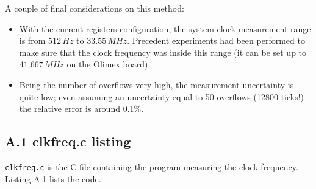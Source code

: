 A couple of final considerations on this method:

\begin{itemize}
	\item With the current registers configuration, the system clock measurement range is from $512\,Hz$ to $33.55\,MHz$. Precedent experiments had been performed to make sure that the clock frequency was inside this range (it can be set up to $41.667\,MHz$ on the Olimex board).
	\item Being the number of overflows very high, the measurement uncertainty is quite low; even assuming an uncertainty equal to 50 overflows (12800 ticks!) the relative error is around 0.1\%.
\end{itemize}

\subsection*{A.1 \hspace{1.7mm} clkfreq.c listing}
\texttt{clkfreq.c} is the C file containing the program measuring the clock frequency. Listing A.1 lists the code.

